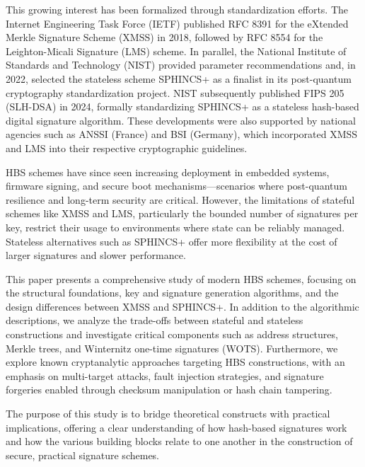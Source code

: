 \documentclass[version=preprint]{iacrcc}
\begin{document}
This growing interest has been formalized through standardization efforts. The Internet Engineering Task Force (IETF) published RFC 8391 for the eXtended Merkle Signature Scheme (XMSS) in 2018, followed by RFC 8554 for the Leighton-Micali Signature (LMS) scheme. In parallel, the National Institute of Standards and Technology (NIST) provided parameter recommendations and, in 2022, selected the stateless scheme SPHINCS+ as a finalist in its post-quantum cryptography standardization project. NIST subsequently published FIPS 205 (SLH-DSA) in 2024, formally standardizing SPHINCS+ as a stateless hash-based digital signature algorithm. These developments were also supported by national agencies such as ANSSI (France) and BSI (Germany), which incorporated XMSS and LMS into their respective cryptographic guidelines.

HBS schemes have since seen increasing deployment in embedded systems, firmware signing, and secure boot mechanisms—scenarios where post-quantum resilience and long-term security are critical. However, the limitations of stateful schemes like XMSS and LMS, particularly the bounded number of signatures per key, restrict their usage to environments where state can be reliably managed. Stateless alternatives such as SPHINCS+ offer more flexibility at the cost of larger signatures and slower performance.

This paper presents a comprehensive study of modern HBS schemes, focusing on the structural foundations, key and signature generation algorithms, and the design differences between XMSS and SPHINCS+. In addition to the algorithmic descriptions, we analyze the trade-offs between stateful and stateless constructions and investigate critical components such as address structures, Merkle trees, and Winternitz one-time signatures (WOTS). Furthermore, we explore known cryptanalytic approaches targeting HBS constructions, with an emphasis on multi-target attacks, fault injection strategies, and signature forgeries enabled through checksum manipulation or hash chain tampering.

The purpose of this study is to bridge theoretical constructs with practical implications, offering a clear understanding of how hash-based signatures work and how the various building blocks relate to one another in the construction of secure, practical signature schemes.
\end{document}
